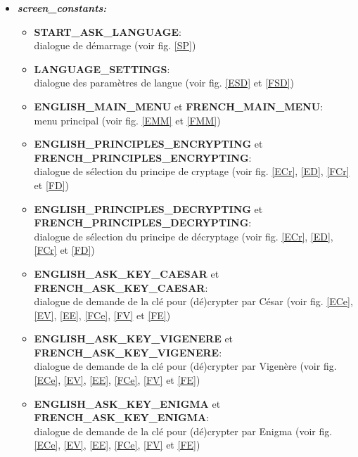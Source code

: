 \documentclass[a4paper,12pt,abstracton,titlepage]{scrartcl}
\begin{document}
\begin{itemize}
\item \textit{\textbf{screen\_constants:}}\vspace{0.2cm}
\begin{itemize}
\item \textbf{START\_ASK\_LANGUAGE}:\\
dialogue de démarrage (voir fig. \ref{SP})\\
\item \textbf{LANGUAGE\_SETTINGS}:\\
dialogue des paramètres de langue (voir fig. \ref{ESD} et \ref{FSD})\\
\item \textbf{ENGLISH\_MAIN\_MENU} et \textbf{FRENCH\_MAIN\_MENU}:\\
menu principal (voir fig. \ref{EMM} et \ref{FMM})\\
\item \textbf{ENGLISH\_PRINCIPLES\_ENCRYPTING} et\\
\textbf{FRENCH\_PRINCIPLES\_ENCRYPTING}:\\
dialogue de sélection du principe de cryptage (voir fig. \ref{ECr}, \ref{ED}, \ref{FCr} et \ref{FD})\\
\item \textbf{ENGLISH\_PRINCIPLES\_DECRYPTING} et\\
\textbf{FRENCH\_PRINCIPLES\_DECRYPTING}:\\
dialogue de sélection du principe de décryptage (voir fig. \ref{ECr}, \ref{ED}, \ref{FCr} et \ref{FD})\\
\item \textbf{ENGLISH\_ASK\_KEY\_CAESAR} et \textbf{FRENCH\_ASK\_KEY\_CAESAR}:\\
dialogue de demande de la clé pour (dé)crypter par César (voir fig. \ref{ECe}, \ref{EV}, \ref{EE}, \ref{FCe}, \ref{FV} et \ref{FE})\\
\item \textbf{ENGLISH\_ASK\_KEY\_VIGENERE} et \textbf{FRENCH\_ASK\_KEY\_VIGENERE}:\\
dialogue de demande de la clé pour (dé)crypter par Vigenère (voir fig. \ref{ECe}, \ref{EV}, \ref{EE}, \ref{FCe}, \ref{FV} et \ref{FE})\\
\item \textbf{ENGLISH\_ASK\_KEY\_ENIGMA} et \textbf{FRENCH\_ASK\_KEY\_ENIGMA}:\\
dialogue de demande de la clé pour (dé)crypter par Enigma (voir fig. \ref{ECe}, \ref{EV}, \ref{EE}, \ref{FCe}, \ref{FV} et \ref{FE})\\

\end{itemize}
\end{itemize}
\end{document}
